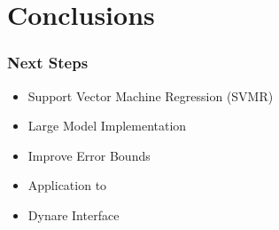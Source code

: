 \documentclass[notheorems]{beamer}
\begin{document}
\section{Conclusions}
\label{sec:conclusions}


\begin{frame}
  \frametitle{Next Steps}
\begin{itemize}
\item Support Vector Machine Regression (SVMR)
\item Large Model Implementation
\item Improve Error Bounds
\item Application to \cite{feng14:_num}
\item Dynare Interface
\end{itemize}

\end{frame}





\end{document}
